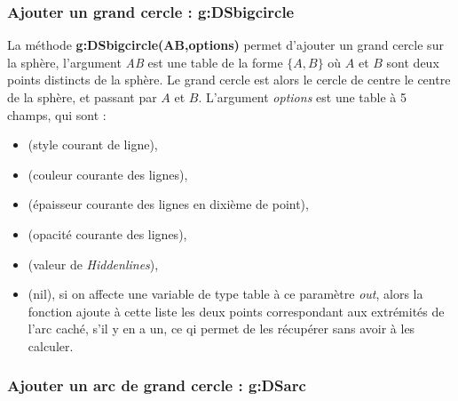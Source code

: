 \subsubsection{Ajouter un grand cercle : g:DSbigcircle}

La méthode \textbf{g:DSbigcircle(AB,options)} permet d'ajouter un grand cercle sur la sphère, l'argument \emph{AB} est une table de la forme $\{A,B\}$ où $A$ et $B$ sont deux points distincts de la sphère. Le grand cercle est alors le cercle de centre le centre de la sphère, et passant par $A$ et $B$. L'argument \emph{options} est une table à 5 champs, qui sont :
    \begin{itemize}
        \item {} (style courant de ligne), 
        \item {} (couleur courante des lignes),
        \item {} (épaisseur courante des lignes en dixième de point),
        \item {} (opacité courante des lignes),
        \item {} (valeur de \emph{Hiddenlines}),
        \item {} (nil), si on affecte une variable de type table à ce paramètre \emph{out}, alors la fonction ajoute à cette liste les deux points correspondant aux extrémités de l'arc caché, s'il y en a un, ce qi permet de les récupérer sans avoir à les calculer.
    \end{itemize}

\subsubsection{Ajouter un arc de grand cercle : g:DSarc}

